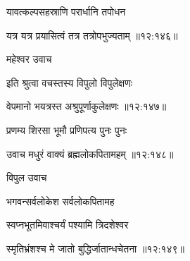 {\devanagarifont यावत्कल्पसहस्राणि परार्धानि तपोधन  \danda\dontdisplaylinenum }%


{\devanagarifont यत्र यत्र प्रयासित्वं तत्र तत्रोपभुज्यताम् {॥१२:१४६॥} \veg\dontdisplaylinenum }%

{\devanagarifont महेश्वर उवाच {\dandab}\dontdisplaylinenum  }%
 
{\devanagarifont इति श्रुत्वा वचस्तस्य विपुलो विपुलेक्षणः \thinspace{\danda} \dontdisplaylinenum }%


{\devanagarifont वेपमानो भयत्रस्त अश्रुपूर्णाकुलेक्षणः {॥१२:१४७॥} \veg\dontdisplaylinenum }%

{\devanagarifont प्रणम्य शिरसा भूमौ प्रणिपत्य पुनः पुनः \thinspace{\dandab} \dontdisplaylinenum }%


{\devanagarifont उवाच मधुरं वाक्यं ब्रह्मलोकपितामहम् {॥१२:१४८॥} \veg\dontdisplaylinenum }%

{\devanagarifont विपुल उवाच {\dandab}\dontdisplaylinenum  }%
 
{\devanagarifont भगवन्सर्वलोकेश सर्वलोकपितामह \thinspace{\danda} \dontdisplaylinenum }%
 
{\devanagarifont स्वप्नभूतमिवाश्चर्यं पश्यामि त्रिदशेश्वर  \danda\dontdisplaylinenum }%


{\devanagarifont स्मृतिभ्रंशश्च मे जातो बुद्धिर्जातान्धचेतना {॥१२:१४९॥} \veg\dontdisplaylinenum }%

